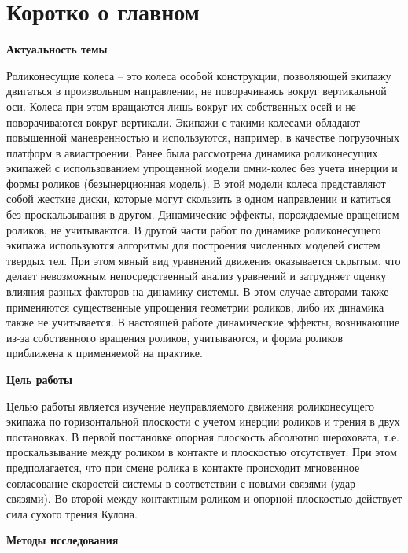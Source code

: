 \section{Коротко о главном}

\textbf{Актуальность темы}

Роликонесущие колеса – это колеса особой конструкции, позволяющей экипажу двигаться в произвольном направлении, не поворачиваясь вокруг вертикальной оси. Колеса при этом вращаются лишь вокруг их собственных осей и не поворачиваются вокруг вертикали. Экипажи с такими колесами обладают повышенной маневренностью и используются, например, в качестве погрузочных платформ в авиастроении.
Ранее была рассмотрена динамика роликонесущих экипажей с использованием упрощенной модели омни-колес без учета инерции и формы роликов (безынерционная модель). В этой модели колеса  представляют собой жесткие диски, которые могут скользить в одном направлении и катиться без проскальзывания в другом. Динамические эффекты, порождаемые вращением роликов, не учитываются. В другой части работ по динамике роликонесущего экипажа используются  алгоритмы для построения численных моделей систем твердых тел. При этом явный вид уравнений движения оказывается скрытым, что делает невозможным непосредственный анализ уравнений и затрудняет оценку влияния разных факторов на динамику системы. В этом случае авторами также применяются существенные упрощения геометрии роликов, либо их динамика также не учитывается.
В настоящей работе динамические эффекты, возникающие из-за собственного вращения роликов, учитываются, и форма роликов приближена к применяемой на практике.

\textbf{Цель работы}

Целью работы является изучение неуправляемого движения роликонесущего экипажа по горизонтальной плоскости с учетом инерции роликов и трения в двух постановках. В первой постановке опорная плоскость абсолютно шероховата, т.е. проскальзывание между роликом в контакте и плоскостью отсутствует. При этом предполагается, что при смене ролика в контакте происходит мгновенное согласование скоростей системы в соответствии с новыми связями (удар связями). Во второй между контактным роликом и опорной плоскостью действует сила сухого трения Кулона. 

\textbf{Методы исследования}

